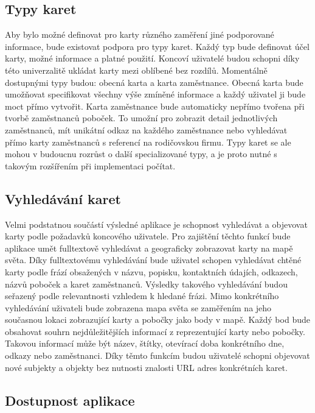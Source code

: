 	\subsection{Typy karet}

	Aby bylo možné definovat pro karty různého zaměření jiné podporované informace, bude existovat podpora pro typy karet.
	Každý typ bude definovat účel karty, možné informace a platné použití.
	Koncoví uživatelé budou schopni díky této univerzalitě ukládat karty mezi oblíbené bez rozdílů.
	Momentálně dostupnými typy budou: obecná karta a karta zaměstnance.
	Obecná karta bude umožňovat specifikovat všechny výše zmíněné informace a každý uživatel ji bude moct přímo vytvořit.
	Karta zaměstnance bude automaticky nepřímo tvořena při tvorbě zaměstnanců poboček.
	To umožní pro zobrazit detail jednotlivých zaměstnanců, mít unikátní odkaz na každého zaměstnance nebo vyhledávat
	přímo karty zaměstnanců s referencí na rodičovskou firmu.
	Typy karet se ale mohou v budoucnu rozrůst o další specializované typy, a je proto nutné s takovým rozšířením při
	implementaci počítat.

	\subsection{Vyhledávání karet}

	Velmi podstatnou součástí výsledné aplikace je schopnost vyhledávat a objevovat karty podle požadavků koncového uživatele.
	Pro zajištění těchto funkcí bude aplikace umět fulltextově vyhledávat a geograficky zobrazovat karty na mapě světa.
	Díky fulltextovému vyhledávání bude uživatel schopen vyhledávat chtěné karty podle frází obsažených v názvu,
	popisku, kontaktních údajích, odkazech, názvů poboček a karet zaměstnanců.
	Výsledky takového vyhledávání budou seřazený podle relevantnosti vzhledem k hledané frázi.
	Mimo konkrétního vyhledávání uživateli bude zobrazena mapa světa se zaměřením na jeho současnou lokaci zobrazující
	karty a pobočky jako body v mapě.
	Každý bod bude obsahovat souhrn nejdůležitějších informací z reprezentující karty nebo pobočky.
	Takovou informací může být název, štítky, otevírací doba konkrétního dne, odkazy nebo zaměstnanci.
	Díky těmto funkcím budou uživatelé schopni objevovat nové subjekty a objekty bez nutnosti znalosti \ac{URL} adres
	konkrétních karet.

	\subsection{Dostupnost aplikace}

